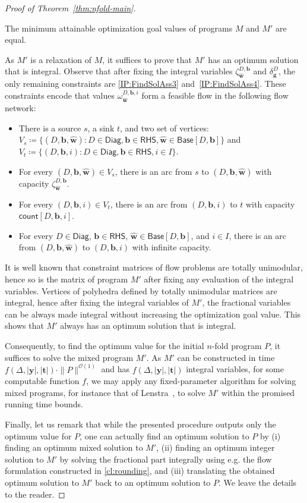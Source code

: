 \documentclass{article}
\newcommand{\tup}[1]{{\mathbf{#1}}}
\newcommand{\ww}{\tup w}
\newcommand{\whww}{{\widehat{\ww}}}
\newcommand{\yy}{\tup y}
\newcommand{\tv}{\tup t}
\newcommand{\bb}{\tup b}
\renewcommand{\gg}{\tup g}
\newcommand{\Oh}{{\mathcal{O}}}
\newcommand{\RHS}{\mathsf{RHS}}
\newcommand{\Diag}{\mathsf{Diag}}
\newcommand{\Base}{\mathsf{Base}}
\newcommand{\cntTypes}{\mathsf{count}}
\begin{document}
\begin{proof}[Proof of Theorem~\ref{thm:nfold-main}]
\begin{techclaim}\label{cl:rounding}
    The minimum attainable optimization goal values of programs $M$ and $M'$ are equal.
\end{techclaim}
\begin{subproof}
As $M'$ is a relaxation of $M$, it suffices to prove that $M'$ has an optimum solution that is integral.
Observe that after fixing the integral variables $\zeta^{D,\bb}_{\whww}$ and $\delta^D_\gg$, the only remaining constraints are \cref{IP:FindSolAss3} and~\cref{IP:FindSolAss4}. These constraints encode that values $\omega^{D,\bb,i}_{\whww}$ form a feasible flow in the following flow network:
\begin{itemize}[nosep]
    \item There is a source $s$, a sink $t$, and two set of vertices: $V_s\coloneqq \{(D,\bb,\whww)\colon D\in \Diag, \bb\in \RHS, \whww\in \Base[D,\bb]\}$ and $V_t\coloneqq \{(D,\bb,i)\colon D\in \Diag, \bb\in \RHS, i\in I\}$.
    \item For every $(D,\bb,\whww)\in V_s$, there is an arc from $s$ to $(D,\bb,\whww)$ with capacity $\zeta_{\whww}^{D,\bb}$.
    \item For every $(D,\bb,i)\in V_t$, there is an arc from $(D,\bb,i)$ to $t$ with capacity $\cntTypes[D,\bb,i]$.
    \item For every $D\in \Diag$, $\bb\in \RHS$, $\whww\in \Base[D,\bb]$, and $i\in I$, there is an arc from $(D,\bb,\whww)$ to $(D,\bb,i)$ with infinite capacity.
\end{itemize}
It is well known that constraint matrices of flow problems are totally unimodular, hence so is the matrix of program $M'$ after fixing any evaluation of the integral variables. Vertices of polyhedra defined by totally unimodular matrices are integral, hence after fixing the integral variables of $M'$, the fractional variables can be always made integral without increasing the optimization goal value. This shows that $M'$ always has an optimum solution that is integral.
\end{subproof}

Consequently, to find the optimum value for the initial $n$-fold program $P$, it suffices to solve the mixed program $M'$. As $M'$ can be constructed in time $f(\Delta,|\yy|,|\tv|)\cdot \|P\|^{\Oh(1)}$ and has $f(\Delta,|\yy|,|\tv|)$ integral variables, for some computable function $f$, we may apply any fixed-parameter algorithm for solving mixed programs, for instance that of Lenstra~\cite{Lenstra1983}, to solve $M'$ within the promised running time bounds.

Finally, let us remark that while the presented procedure outputs only the optimum value for $P$, one can actually find an optimum solution to $P$ by (i) finding an optimum mixed solution to $M'$, (ii) finding an optimum integer solution to $M'$ by solving the fractional part integrally using e.g. the flow formulation constructed in \cref{cl:rounding}, and (iii) translating the obtained optimum solution to $M'$ back to an optimum solution to $P$. We leave the details to the reader.
\end{proof}
\end{document}
